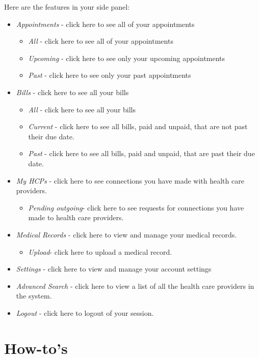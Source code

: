 \documentclass[12pt]{report}
\begin{document}
Here are the features in your side panel:
\begin{itemize}
\item \textit{Appointments} - click here to see all of your appointments
\begin{itemize}
\item \textit{All} - click here to see all of your appointments
\item \textit{Upcoming} - click here to see only your upcoming appointments
\item \textit{Past} - click here to see only your past appointments
\end{itemize}
\item \textit{Bills} - click here to see all your bills
\begin{itemize} 
\item \textit{All} - click here to see all your bills
\item \textit{Current} - click here to see all bills, paid and unpaid, that are not past their due date.
\item \textit{Past}  - click here to see all bills, paid and unpaid, that are past their due date.
\end{itemize}
\item \textit{My HCPs} - click here to see connections you have made with health care providers.
\begin{itemize}
\item \textit{Pending outgoing}- click here to see requests for connections you have made to health care providers.
\end{itemize}
\item \textit{Medical Records} - click here to view and manage your medical records.
\begin{itemize}
\item \textit{Upload}- click here to upload a medical record.
\end{itemize}
\item \textit{Settings} - click here to view and manage your account settings
\item \textit{Advanced Search} - click here to view a list of all the health care providers in the system.
\item \textit{Logout} - click here to logout of your session.
\end{itemize}

\section{How-to's}
\end{document}
